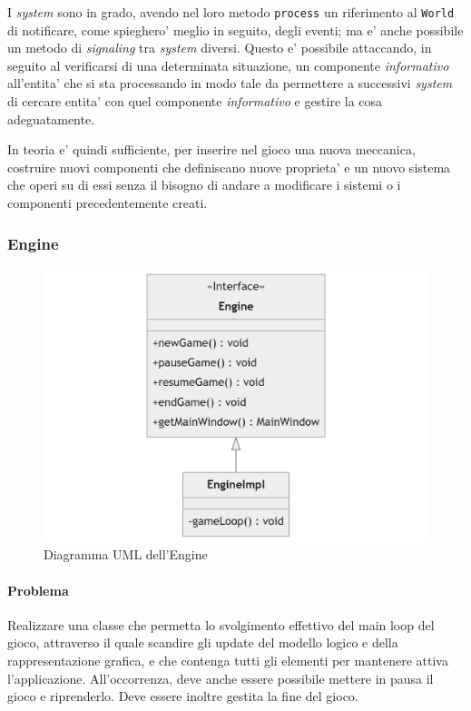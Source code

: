 \documentclass[a4paper,12pt]{report}
\begin{document}
I \textit{system} sono in grado, avendo nel loro metodo \texttt{process} un riferimento al \texttt{World} di notificare, come spieghero' meglio in seguito, degli eventi; ma e' anche possibile un metodo di \textit{signaling} tra \textit{system} diversi. Questo e' possibile attaccando, in seguito al verificarsi di una determinata situazione, un componente \textit{informativo} all'entita' che si sta processando in modo tale da permettere a successivi \textit{system} di cercare entita' con quel componente \textit{informativo} e gestire la cosa adeguatamente.

In teoria e' quindi sufficiente, per inserire nel gioco una nuova meccanica, costruire nuovi componenti che definiscano nuove proprieta' e un nuovo sistema che operi su di essi senza il bisogno di andare a modificare i sistemi o i componenti precedentemente creati.

\subsubsection{Engine}

\begin{figure}[h]
	\centering
	\includegraphics[width=\textwidth]{uml/uml_engine.png}
	\caption{Diagramma UML dell'Engine}
	\label{img:badarch}
\end{figure}

\paragraph*{Problema}
Realizzare una classe che permetta lo svolgimento effettivo del main loop del gioco, attraverso il quale scandire gli update del modello logico e della rappresentazione grafica, e che contenga tutti gli elementi per mantenere attiva l'applicazione. All'occorrenza, deve anche essere possibile mettere in pausa il gioco e riprenderlo. Deve essere inoltre gestita la fine del gioco.
\end{document}

